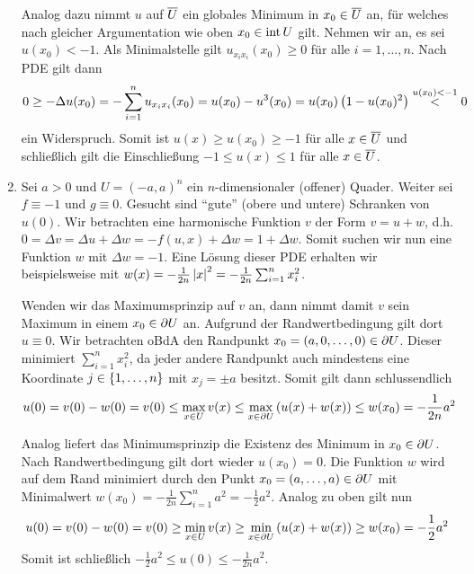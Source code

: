 \begin{exercisePage}
\begin{enumerate}[label=(zu \alph*), leftmargin=*]
		Analog dazu nimmt $u$ auf $\overline{U}$ ein globales Minimum in $x_0 \in \overline{U}$ an, für welches nach gleicher Argumentation wie oben $x_0 \in \operatorname{int} U$ gilt. Nehmen wir an, es sei $u(x_0) < -1$. Als Minimalstelle gilt $u_{x_i  x_i} (x_0) \ge 0$ für alle $i = 1, \dots, n$. Nach PDE gilt dann
		\begin{equation*}
			0 \ge - \Delta u(x_0) =  - \sum_{i=1}^n u_{x_i x_i} (x_0) = u(x_0) - u^3(x_0) = u(x_0) \left( 1 - u(x_0)^2 \right) \overset{u(x_0) < -1}{<} 0
		\end{equation*} 
		ein Widerspruch. Somit ist $u(x) \ge u(x_0) \ge -1$ für alle $x \in \overline{U}$ und schließlich gilt die Einschließung $-1 \le u(x) \le 1$ für alle $x \in \overline{U}$.
		
		\item Sei $a > 0$ und $U = (-a , a)^n$ ein $n$-dimensionaler (offener) Quader. Weiter sei $f \equiv -1$ und $g \equiv 0$. Gesucht sind \enquote{gute} (obere und untere) Schranken von $u(0)$.
		Wir betrachten eine harmonische Funktion $v$ der Form $v = u + w$, d.h. $0 = \Delta v = \Delta u + \Delta w = - f(u,x) + \Delta w = 1 + \Delta w$. Somit suchen wir nun eine Funktion $w$ mit $\Delta w = -1$. Eine Lösung dieser PDE erhalten wir beispielsweise mit $w(x) = - \frac{1}{2n} \left| x \right|^2 = - \frac{1}{2n}\sum_{i=1}^n x_i^2$. 
		
		Wenden wir das Maximumsprinzip auf $v$ an, dann nimmt damit $v$ sein Maximum in einem $x_0 \in \partial U$ an. Aufgrund der Randwertbedingung gilt dort $u \equiv 0$. Wir betrachten oBdA den Randpunkt $x_0 = (a, 0, \dots, 0) \in \partial U$. Dieser minimiert $\sum_{i=1}^n x_i^2$, da jeder andere Randpunkt auch mindestens eine Koordinate $j \in \left\{ 1, \dots, n \right\}$ mit $x_j = \pm a$ besitzt. Somit gilt dann schlussendlich
		\begin{equation*}
			u(0) = v(0) - w(0) = v(0) \le \max_{x \in U} v(x) \le \max_{x \in \partial U} \left( u(x) + w(x) \right) \le w(x_0) = - \frac{1}{2n} a^2
		\end{equation*}
		
		Analog liefert das Minimumsprinzip die Existenz des Minimum in $x_0 \in \partial U$. Nach Randwertbedingung gilt dort wieder $u(x_0) = 0$. Die Funktion $w$ wird auf dem Rand minimiert durch den Punkt $x_0 = (a, \dots, a) \in \partial U$ mit Minimalwert $w(x_0) = - \frac{1}{2n} \sum_{i=1}^n a^2 = - \frac{1}{2} a^2$. Analog zu oben gilt nun
		\begin{equation*}
			u(0) = v(0) - w(0) = v(0) \ge \min_{x \in U} v(x) \ge \min_{x \in \partial U} \left( u(x) + w(x) \right) \ge w(x_0) = - \frac{1}{2} a^2
		\end{equation*}
		Somit ist schließlich $- \frac{1}{2} a^2 \le u(0) \le - \frac{1}{2n} a^2$.
		

\end{enumerate}
\end{exercisePage}

